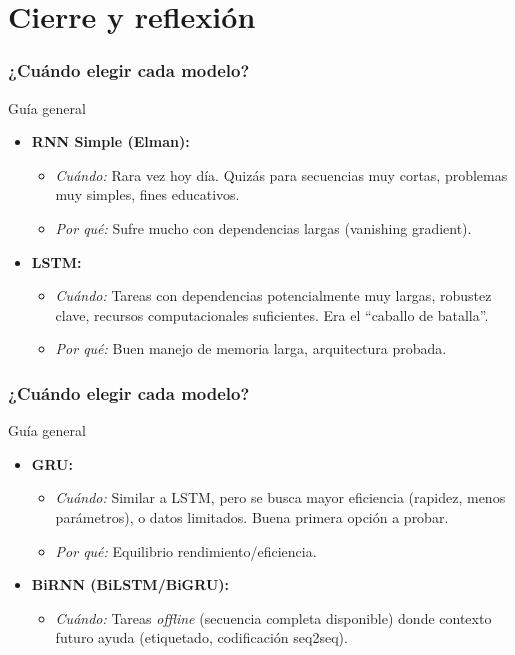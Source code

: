 \documentclass[handout]{beamer}
\begin{document}
\section{Cierre y reflexión}
\begin{frame}
    \frametitle{¿Cuándo elegir cada modelo?}
    \begin{block}{Guía general}
        \begin{itemize}
            \item \textbf{RNN Simple (Elman):}
                \begin{itemize}
                    \item \textit{Cuándo:} Rara vez hoy día. Quizás para secuencias muy cortas, problemas muy simples, fines educativos.
                    \item \textit{Por qué:} Sufre mucho con dependencias largas (vanishing gradient).
                \end{itemize} \bigskip
            \item \textbf{LSTM:}
                 \begin{itemize}
                    \item \textit{Cuándo:} Tareas con dependencias potencialmente muy largas, robustez clave, recursos computacionales suficientes. Era el ``caballo de batalla''.
                    \item \textit{Por qué:} Buen manejo de memoria larga, arquitectura probada.
                \end{itemize}
        \end{itemize}
    \end{block}
\end{frame}

\begin{frame}
    \frametitle{¿Cuándo elegir cada modelo?}
    \begin{block}{Guía general}
        \begin{itemize}
            \item \textbf{GRU:}
                 \begin{itemize}
                    \item \textit{Cuándo:} Similar a LSTM, pero se busca mayor eficiencia (rapidez, menos parámetros), o datos limitados. Buena primera opción a probar.
                    \item \textit{Por qué:} Equilibrio rendimiento/eficiencia.
                \end{itemize} \bigskip
                \item \textbf{BiRNN (BiLSTM/BiGRU):}
                \begin{itemize}
                   \item \textit{Cuándo:} Tareas \textit{offline} (secuencia completa disponible) donde contexto futuro ayuda (etiquetado, codificación seq2seq).
                \end{itemize} \bigskip
            \end{itemize}
    \end{block}
\end{frame}
\end{document}
